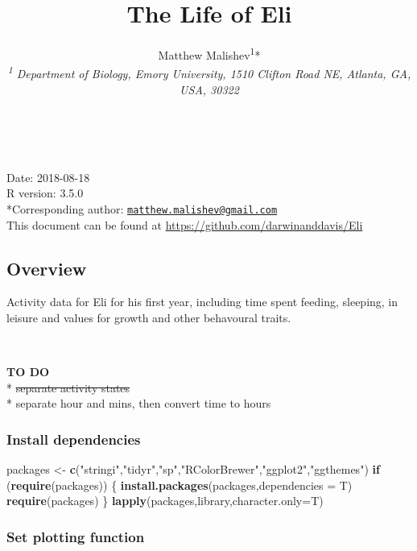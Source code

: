 \documentclass[10,portrait]{article}
\title{The Life of Eli}
\author{Matthew Malishev\textsuperscript{1}*\\
\emph{\textsuperscript{1} Department of Biology, Emory University, 1510
Clifton Road NE, Atlanta, GA, USA, 30322}}
\date{}
\newenvironment{Shaded}{\begin{snugshade}}{\end{snugshade}}
\newcommand{\KeywordTok}[1]{\textcolor[rgb]{0.13,0.29,0.53}{\textbf{#1}}}
\newcommand{\DataTypeTok}[1]{\textcolor[rgb]{0.13,0.29,0.53}{#1}}
\newcommand{\StringTok}[1]{\textcolor[rgb]{0.31,0.60,0.02}{#1}}
\newcommand{\ControlFlowTok}[1]{\textcolor[rgb]{0.13,0.29,0.53}{\textbf{#1}}}
\newcommand{\NormalTok}[1]{#1}
\begin{document}
\maketitle

{
\hypersetup{linkcolor=black}
\setcounter{tocdepth}{4}
\tableofcontents
}
~

Date: 2018-08-18\\
R version: 3.5.0\\
*Corresponding author:
\href{mailto:matthew.malishev@gmail.com}{\nolinkurl{matthew.malishev@gmail.com}}\\
This document can be found at
\url{https://github.com/darwinanddavis/Eli}

\newpage  

\subsection{Overview}\label{overview}

Activity data for Eli for his first year, including time spent feeding,
sleeping, in leisure and values for growth and other behavoural traits.

~

\textbf{TO DO}\\
* \sout{separate activity states}\\
* separate hour and mins, then convert time to hours

\subsubsection{Install dependencies}\label{install-dependencies}

\begin{Shaded}
\begin{Highlighting}[]
\NormalTok{packages <-}\StringTok{ }\KeywordTok{c}\NormalTok{(}\StringTok{"stringi"}\NormalTok{,}\StringTok{"tidyr"}\NormalTok{,}\StringTok{"sp"}\NormalTok{,}\StringTok{"RColorBrewer"}\NormalTok{,}\StringTok{"ggplot2"}\NormalTok{,}\StringTok{"ggthemes"}\NormalTok{)   }
\ControlFlowTok{if}\NormalTok{ (}\KeywordTok{require}\NormalTok{(packages)) \{}
    \KeywordTok{install.packages}\NormalTok{(packages,}\DataTypeTok{dependencies =}\NormalTok{ T)}
    \KeywordTok{require}\NormalTok{(packages)}
\NormalTok{\}}
\KeywordTok{lapply}\NormalTok{(packages,library,}\DataTypeTok{character.only=}\NormalTok{T)}
\end{Highlighting}
\end{Shaded}

\subsubsection{Set plotting function}\label{set-plotting-function}
\end{document}
